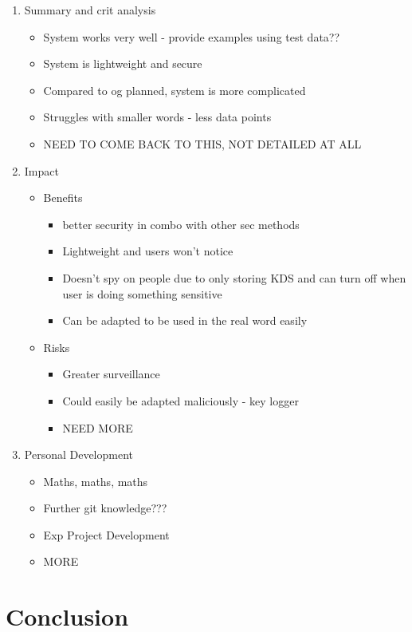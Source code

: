 \documentclass[10pt,a4paper]{report}
\begin{document}
\begin{enumerate}
	\item Summary and crit analysis
	\begin{itemize}
		\item System works very well - provide examples using test data??
		\item System is lightweight and secure
		\item Compared to og planned, system is more complicated
		\item Struggles with smaller words - less data points
		\item NEED TO COME BACK TO THIS, NOT DETAILED AT ALL
	\end{itemize}
	\item Impact
	\begin{itemize}
		\item Benefits 
		\begin{itemize}
			\item better security in combo with other sec methods
			\item Lightweight and users won't notice
			\item Doesn't spy on people due to only storing KDS and can turn off when user is doing something sensitive
			\item Can be adapted to be used in the real word easily
		\end{itemize}
		\item Risks
		\begin{itemize}
			\item Greater surveillance
			\item Could easily be adapted maliciously - key logger
			\item NEED MORE
		\end{itemize}
	\end{itemize}
	\item Personal Development
	\begin{itemize}
		\item Maths, maths, maths
		\item Further git knowledge???
		\item Exp Project Development
		\item MORE
	\end{itemize}
\end{enumerate}
\chapter{Conclusion}
\end{document}
